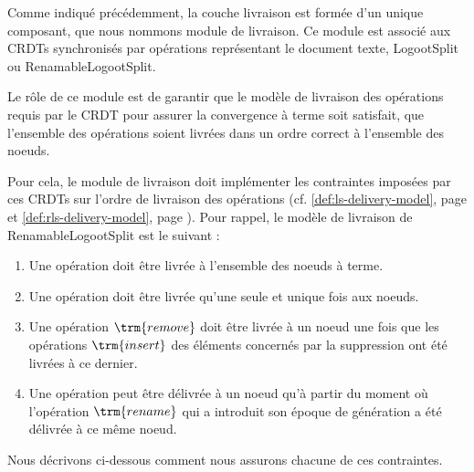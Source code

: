 \label{sec:mute-delivery-model}

Comme indiqué précédemment, la couche livraison est formée d'un unique composant, que nous nommons module de livraison.
Ce module est associé aux \acp{CRDT} synchronisés par opérations représentant le document texte, \ie LogootSplit ou RenamableLogootSplit.

Le rôle de ce module est de garantir que le modèle de livraison des opérations requis par le \ac{CRDT} pour assurer la convergence à terme  soit satisfait, \ie que l'ensemble des opérations soient livrées dans un ordre correct à l'ensemble des noeuds.

Pour cela, le module de livraison doit implémenter les contraintes imposées par ces \acp{CRDT} sur l'ordre de livraison des opérations (cf. \autoref{def:ls-delivery-model}, page \pageref{def:ls-delivery-model} et \autoref{def:rls-delivery-model}, page \pageref{def:ls-delivery-model}).
Pour rappel, le modèle de livraison de RenamableLogootSplit est le suivant :
\begin{enumerate}
    \item Une opération doit être livrée à l'ensemble des noeuds à terme.
    \item Une opération doit être livrée qu'une seule et unique fois aux noeuds.
    \item Une opération $\trm{remove}$ doit être livrée à un noeud une fois que les opérations $\trm{insert}$ des éléments concernés par la suppression ont été livrées à ce dernier.
    \item Une opération peut être délivrée à un noeud qu'à partir du moment où l'opération $\trm{rename}$ qui a introduit son époque de génération a été délivrée à ce même noeud.
\end{enumerate}

Nous décrivons ci-dessous comment nous assurons chacune de ces contraintes.
